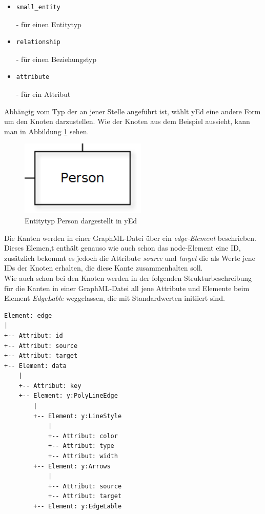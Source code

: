 \begin{itemize}
	\item \begin{verbatim}small_entity\end{verbatim}
	- für einen Entitytyp
	\item \begin{verbatim}relationship\end{verbatim}
	- für einen Beziehungstyp
	\item \begin{verbatim}attribute\end{verbatim}
	- für ein Attribut
	\\
\end{itemize}

\noindent
Abhängig vom Typ der an jener Stelle angeführt ist, wählt yEd eine andere Form um den Knoten darzustellen. Wie der Knoten aus dem Beispiel aussieht, kann man in Abbildung \ref{entityPerson} sehen.

\begin{figure}[!h]
	\begin{center}
		\includegraphics[width=6cm]{images/entityPerson.png}
		\caption{Entitytyp Person dargestellt in yEd}
		\label{entityPerson}
	\end{center}
\end{figure}

\prc

\noindent
Die Kanten werden in einer GraphML-Datei über ein \textit{edge-Element} beschrieben. Dieses Elemen,t enthält genauso wie auch schon das node-Element eine ID, zusätzlich bekommt es jedoch die Attribute \textit{source} und \textit{target} die als Werte jene IDs der Knoten erhalten, die diese Kante zusammenhalten soll.
\\

\noindent
Wie auch schon bei den Knoten werden in der folgenden Strukturbeschreibung für die Kanten in einer GraphML-Datei all jene Attribute und Elemente beim Element \textit{EdgeLable} weggelassen, die mit Standardwerten initiiert sind.

\begin{verbatim}
Element: edge
|
+-- Attribut: id
+-- Attribut: source
+-- Attribut: target
+-- Element: data
    |
    +-- Attribut: key
    +-- Element: y:PolyLineEdge
        |
        +-- Element: y:LineStyle
            |
            +-- Attribut: color
            +-- Attribut: type
            +-- Attribut: width
        +-- Element: y:Arrows
            |
            +-- Attribut: source
            +-- Attribut: target
        +-- Element: y:EdgeLable

\end{verbatim}

